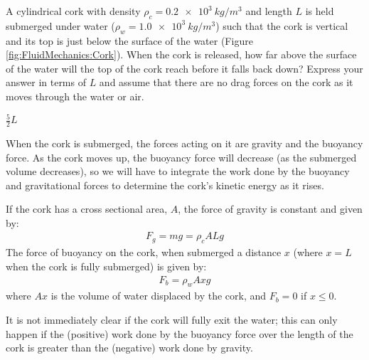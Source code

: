 \question A cylindrical cork with density $\rho_c=\SI{0.2e3}{kg/m^3}$ and length $L$ is held submerged under water ($\rho_w=\SI{1.0e3}{kg/m^3}$) such that the cork is vertical and its top is just below the surface of the water (Figure \ref{fig:FluidMechanics:Cork}). When the cork is released, how far above the surface of the water will the top of the cork reach before it falls back down? Express your answer in terms of $L$ and assume that there are no drag forces on the cork as it moves through the water or air.
\begin{finalanswer}
	$\frac{5}{2}L$
\end{finalanswer}
\begin{solution}
	When the cork is submerged, the forces acting on it are gravity and the buoyancy force. As the cork moves up, the buoyancy force will decrease (as the submerged volume decreases), so we will have to integrate the work done by the buoyancy and gravitational forces to determine the cork's kinetic energy as it rises.
	
	If the cork has a cross sectional area, $A$, the force of gravity is constant and given by:
	\begin{align*}
	F_g = mg = \rho_c ALg
	\end{align*}
	The force of buoyancy on the cork, when submerged a distance $x$ (where $x=L$ when the cork is fully submerged) is given by:
	\begin{align*}
	F_b = \rho_w Axg
	\end{align*}
	where $Ax$ is the volume of water displaced by the cork, and $F_b=0$ if $x\leq 	0$. 
	
	It is not immediately clear if the cork will fully exit the water; this can only happen if the (positive) work done by the buoyancy force over the length of the cork is greater than the (negative) work done by gravity.
	

\end{solution}

